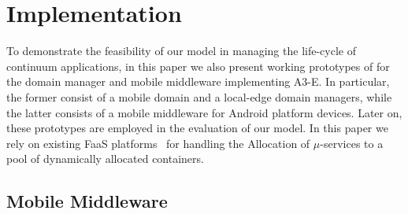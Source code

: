 \section{Implementation}\label{sec:implementation}


To demonstrate the feasibility of our model
in managing the life-cycle of continuum applications, in this paper we also present working prototypes of for the domain manager and mobile middleware implementing A3-E. In particular, the former consist of a mobile domain and a local-edge domain managers, while the latter consists of a mobile middleware for Android platform devices. Later on, these prototypes are employed in the evaluation of our model. In this paper we rely on existing FaaS platforms~\cite{AWSLambda, OpenWhisk} for handling the Allocation of $\mu$-services to a pool of dynamically allocated containers. 






\subsection{Mobile Middleware}~\label{sec:mobile_middleware}


